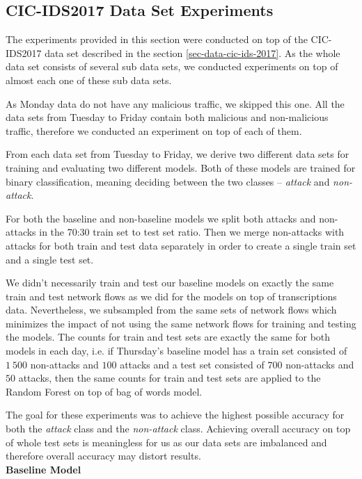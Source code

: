 \documentclass{article}
\begin{document}
\subsection{CIC-IDS2017 Data Set Experiments}\label{sec-cic-ids-experiments}

The experiments provided in this section were conducted on top of the CIC-IDS2017 data set described in the section \ref{sec-data-cic-ids-2017}. As the whole data set consists of several sub data sets, we conducted experiments on top of almost each one of these sub data sets.

As Monday data do not have any malicious traffic, we skipped this one. All the data sets from Tuesday to Friday contain both malicious and non-malicious traffic, therefore we conducted an experiment on top of each of them.

From each data set from Tuesday to Friday, we derive two different data sets for training and evaluating two different models. Both of these models are trained for binary classification, meaning deciding between the two classes -- \textit{attack} and \textit{non-attack}.

For both the baseline and non-baseline models we split both attacks and non-attacks in the 70:30 train set to test set ratio. Then we merge non-attacks with attacks for both train and test data separately in order to create a single train set and a single test set.

We didn't necessarily train and test our baseline models on exactly the same train and test network flows as we did for the models on top of transcriptions data. Nevertheless, we subsampled from the same sets of network flows which minimizes the impact of not using the same network flows for training and testing the models. The counts for train and test sets are exactly the same for both models in each day, i.e. if Thursday's baseline model has a train set consisted of $1\ 500$ non-attacks and $100$ attacks and a test set consisted of $700$ non-attacks and $50$ attacks, then the same counts for train and test sets are applied to the Random Forest on top of bag of words model.

The goal for these experiments was to achieve the highest possible accuracy for both the \textit{attack} class and the \textit{non-attack} class. Achieving overall accuracy on top of whole test sets is meaningless for us as our data sets are imbalanced and therefore overall accuracy may distort results.\\


\noindent\textbf{Baseline Model}
\end{document}
